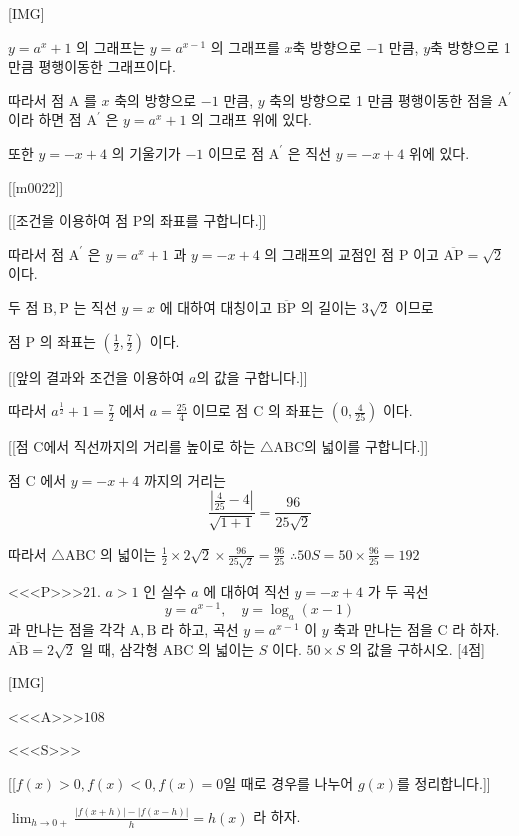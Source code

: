 \documentclass{oblivoir}
\begin{document}
[IMG]

$y=a^{x}+1$ 의 그래프는 $y=a^{x-1}$ 의 그래프를 $x$축 방향으로 $-1$ 만큼, $y$축 방향으로 1 만큼 평행이동한 그래프이다.

따라서 점 $\mathrm{A}$ 를 $x$ 축의 방향으로 $-1$ 만큼, $y$ 축의 방향으로 1 만큼 평행이동한 점을 $\mathrm{A}^{\prime}$ 이라 하면 점 $\mathrm{A}^{\prime}$ 은 $y=a^{x}+1$ 의 그래프 위에 있다.

또한 $y=-x+4$ 의 기울기가 $-1$ 이므로 점 $\mathrm{A}^{\prime}$ 은 직선 $y=-x+4$ 위에 있다.

[[m0022]]

[[조건을 이용하여 점 $\mathrm{P}$의 좌표를 구합니다.]]

따라서 점 $\mathrm{A}^{\prime}$ 은 $y=a^{x}+1$ 과 $y=-x+4$ 의 그래프의 교점인 점 $\mathrm{P}$ 이고 $\overline{\mathrm{AP}}=\sqrt{2}$ 이다.

두 점 $\mathrm{B}, \mathrm{P}$ 는 직선 $y=x$ 에 대하여 대칭이고 $\overline{\mathrm{BP}}$ 의 길이는 $3 \sqrt{2}$ 이므로

점 $\mathrm{P}$ 의 좌표는 $\left(\frac{1}{2}, \frac{7}{2}\right)$ 이다.

[[앞의 결과와 조건을 이용하여 $a$의 값을 구합니다.]]

따라서 $a^{\frac{1}{2}}+1=\frac{7}{2}$ 에서 $a=\frac{25}{4}$ 이므로 점 $\mathrm{C}$ 의 좌표는 $\left(0, \frac{4}{25}\right)$ 이다.

[[점 $\mathrm{C}$에서 직선까지의 거리를 높이로 하는 $\triangle \mathrm{ABC}$의 넓이를 구합니다.]]

점 $\mathrm{C}$ 에서 $y=-x+4$ 까지의 거리는
$$
\frac{\left|\frac{4}{25}-4\right|}{\sqrt{1+1}}=\frac{96}{25 \sqrt{2}}
$$

따라서 $\triangle \mathrm{ABC}$ 의 넓이는 $\frac{1}{2} \times 2 \sqrt{2} \times \frac{96}{25 \sqrt{2}}=\frac{96}{25}$ $\therefore 50 S=50 \times \frac{96}{25}=192$


<<<P>>>21. $a>1$ 인 실수 $a$ 에 대하여 직선 $y=-x+4$ 가 두 곡선
$$
y=a^{x-1}, \quad y=\log _{a}(x-1)
$$
과 만나는 점을 각각 $\mathrm{A}, \mathrm{B}$ 라 하고, 곡선 $y=a^{x-1}$ 이 $y$ 축과 만나는 점을 $\mathrm{C}$ 라 하자. $\overline{\mathrm{AB}}=2 \sqrt{2}$ 일 때, 삼각형 $\mathrm{ABC}$ 의 넓이는 $S$ 이다. $50 \times S$ 의 값을 구하시오. [4점]

[IMG]

<<<A>>>$108$

<<<S>>>

[[$f(x)>0, f(x)<0, f(x)=0$일 때로 경우를 나누어 $g(x)$를 정리합니다.]]

$ \lim _{h \rightarrow 0+} \frac{|f(x+h)|-|f(x-h)|}{h}=h(x)$ 라 하자.
\end{document}
